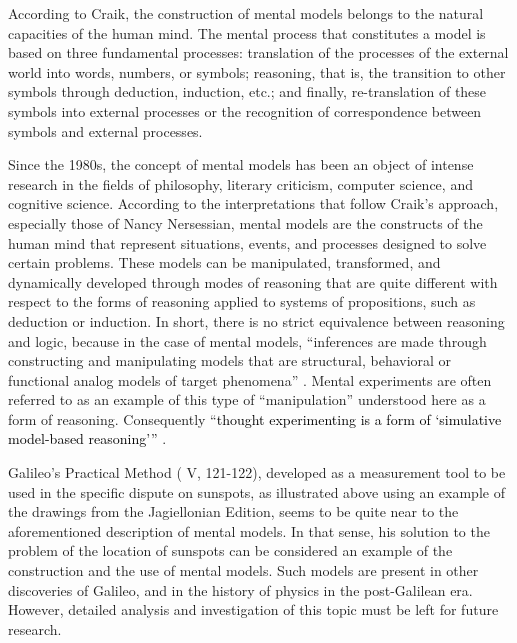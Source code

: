 \begin{artengenv}
According to Craik, the construction of mental models belongs to the natural capacities of the human mind. The mental
process that constitutes a model is based on three fundamental processes: translation of the processes of the external
world into words, numbers, or symbols; reasoning, that is, the transition to other symbols through deduction,
induction, etc.; and finally, re-translation of these symbols into external processes or the recognition of
correspondence between symbols and external processes.

Since the 1980s, the concept of mental models has been an object of intense research in the fields of philosophy,
literary criticism, computer science, and cognitive science. According to the interpretations that follow Craik’s approach,
especially those of Nancy Nersessian, mental models are the constructs of the human mind that represent situations,
events, and processes designed to solve certain problems. These models can be manipulated, transformed, and dynamically
developed through modes of reasoning that are quite different with respect to the forms of reasoning applied to systems
of propositions, such as deduction or induction. In short, there is no strict equivalence between reasoning and logic,
because in the case of mental models, ``inferences are made through constructing and manipulating models that are
structural, behavioral or functional analog models of target phenomena''
\parencite[p.184]{nersessian_creating_2008}.
Mental experiments are often referred to as an example of this type of ``manipulation'' understood here as a form
of reasoning. Consequently ``\textcolor{black}{thought experimenting is a form of `simulative model-based reasoning'''}
\parencite[p.291]{nersessian_theoreticians_1992}.

Galileo’s Practical Method ( V, 121-122), developed as a measurement tool to be used in the specific dispute on
sunspots, as illustrated above using an example of the drawings from the Jagiellonian Edition, seems to be quite near
to the aforementioned description of mental models. In that sense, his solution to the problem of the location of
sunspots can be considered an example of the construction and the use of mental models. Such models are present in
other discoveries of Galileo, and in the history of physics in the post-Galilean era. However, detailed analysis and
investigation of this topic must be left for future research.




\end{artengenv}
